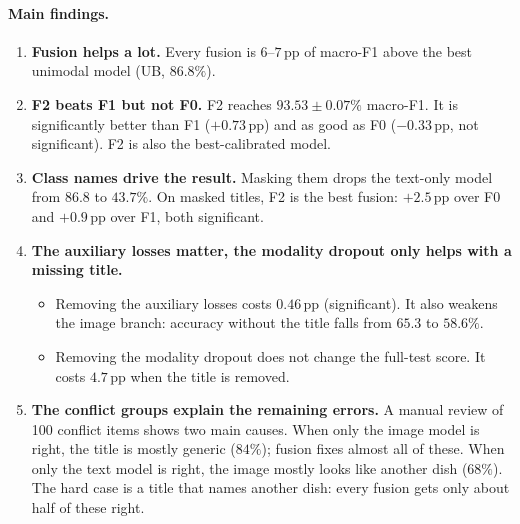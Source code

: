 \paragraph{Main findings.}
\begin{enumerate}
  \item \textbf{Fusion helps a lot.} Every fusion is $6$--$7$\,pp of macro-F1 above the best unimodal model
        (UB, $86.8\%$).
  \item \textbf{F2 beats F1 but not F0.} F2 reaches $93.53\pm0.07\%$ macro-F1. It is significantly better than
        F1 ($+0.73$\,pp) and as good as F0 ($-0.33$\,pp, not significant). F2 is also the best-calibrated model.
  \item \textbf{Class names drive the result.} Masking them drops the text-only model from $86.8$ to $43.7\%$.
        On masked titles, F2 is the best fusion: $+2.5$\,pp over F0 and $+0.9$\,pp over F1, both significant.
  \item \textbf{The auxiliary losses matter, the modality dropout only helps with a missing title.}
        \begin{itemize}
          \item Removing the auxiliary losses costs $0.46$\,pp (significant). It also weakens the image branch:
                accuracy without the title falls from $65.3$ to $58.6\%$.
          \item Removing the modality dropout does not change the full-test score. It costs $4.7$\,pp when the
                title is removed.
        \end{itemize}
  \item \textbf{The conflict groups explain the remaining errors.} A manual review of 100 conflict items shows
        two main causes. When only the image model is right, the title is mostly generic ($84\%$); fusion fixes
        almost all of these. When only the text model is right, the image mostly looks like another dish ($68\%$).
        The hard case is a title that names another dish: every fusion gets only about half of these right.
\end{enumerate}

